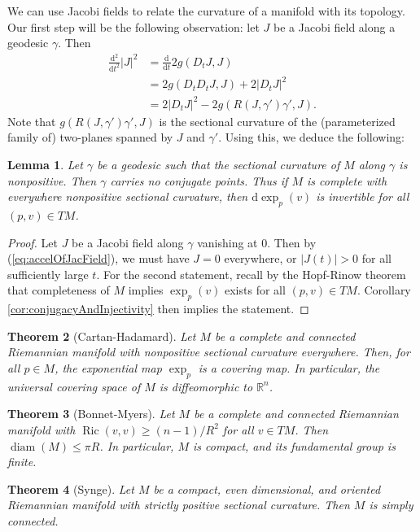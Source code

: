 \documentclass{book}
\newcommand{\bbR}{\mathbb{R}}
\renewcommand{\d}{\mathrm{d}}
\newcommand{\abs}[1]{\left\lvert {#1} \right\rvert}
\newcommand{\odv}[3][]{\frac{\d^{#1}#2}{\d{#3}^{#1}}}
\DeclareMathOperator{\Ric}{\mathrm{Ric}}
\DeclareMathOperator{\diam}{\mathrm{diam}}
\newtheorem{theorem}{Theorem}[section]
\newtheorem{lemma}[theorem]{Lemma}
\theoremstyle{definition}
\numberwithin{equation}{section}
\begin{document}
We can use Jacobi fields to relate the curvature of a manifold with its topology. Our first step will be the following observation: let $J$ be a Jacobi field along a geodesic $\gamma$. Then 
\begin{equation} \begin{aligned} \label{eq:accelOfJacField}
    \odv[2]{}{t} \abs{J}^2 
    &= \odv{}{t} 2 g(D_t J, J) \\
    &= 2 g(D_t D_t J, J) + 2 \abs{D_t J}^2 \\ 
    &= 2 \abs{D_t J}^2 - 2 g(R(J,\gamma')\gamma', J).
\end{aligned} \end{equation}
Note that $g(R(J,\gamma')\gamma', J)$ is the sectional curvature of the (parameterized family of) two-planes spanned by $J$ and $\gamma'$. Using this, we deduce the following:
\begin{lemma}
    Let $\gamma$ be a geodesic such that the sectional curvature of $M$ along $\gamma$ is nonpositive. Then $\gamma$ carries no conjugate points. Thus if $M$ is complete with everywhere nonpositive sectional curvature, then $\d\exp_p(v)$ is invertible for all $(p,v) \in TM$.
\end{lemma}
\begin{proof}
    Let $J$ be a Jacobi field along $\gamma$ vanishing at $0$. Then by (\ref{eq:accelOfJacField}), we must have $J = 0$ everywhere, or $\abs{J(t)} > 0$ for all sufficiently large $t$. For the second statement, recall by the Hopf-Rinow theorem that completeness of $M$ implies $\exp_p(v)$ exists for all $(p,v) \in TM$. Corollary \ref{cor:conjugacyAndInjectivity} then implies the statement.
\end{proof}

\begin{theorem}[Cartan-Hadamard]
    Let $M$ be a complete and connected Riemannian manifold with nonpositive sectional curvature everywhere. Then, for all $p \in M$, the exponential map $\exp_p$ is a covering map. In particular, the universal covering space of $M$ is diffeomorphic to $\bbR^n$.
\end{theorem}

\begin{theorem}[Bonnet-Myers]
    Let $M$ be a complete and connected Riemannian manifold with $\Ric(v,v) \geq (n-1)/R^2$ for all $v \in TM$. Then $\diam(M) \leq \pi R$.
    In particular, $M$ is compact, and its fundamental group is finite.
\end{theorem}

\begin{theorem}[Synge]
    Let $M$ be a compact, even dimensional, and oriented Riemannian manifold with strictly positive sectional curvature. Then $M$ is simply connected.
\end{theorem}
\end{document}
